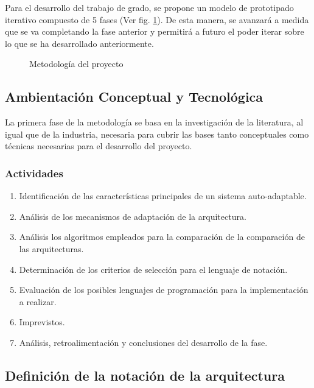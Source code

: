 \documentclass[12pt]{article}
\begin{document}
    Para el desarrollo del trabajo de grado, se propone un modelo de prototipado iterativo compuesto de 5 fases (Ver fig. \ref{fig:met}). De esta manera, se avanzará a medida que se va completando la fase anterior y permitirá a futuro el poder iterar sobre lo que se ha desarrollado anteriormente.

    \begin{figure}[H]
        \centering
        
        \caption{Metodología del proyecto}
        \label{fig:met}
    \end{figure}

    \subsection{Ambientación Conceptual y Tecnológica}

    La primera fase de la metodología se basa en la investigación de la literatura, al igual que de la industria, necesaria para cubrir las bases tanto conceptuales como técnicas necesarias para el desarrollo del proyecto. 

    \subsubsection*{Actividades}

    \begin{enumerate}[label=\thesubsection.\arabic*., wide, labelindent=2em, leftmargin=5em]
        \item Identificación de las características principales de un sistema auto-adaptable.
        \item Análisis de los mecanismos de adaptación de la arquitectura.
        \item Análisis los algoritmos empleados para la comparación de la comparación de las arquitecturas.
        \item Determinación de los criterios de selección para el lenguaje de notación.
        \item Evaluación de los posibles lenguajes de programación para la implementación a realizar.
        \item Imprevistos.
        \item Análisis, retroalimentación y conclusiones del desarrollo de la fase. 
    \end{enumerate} 

    \subsection{Definición de la notación de la arquitectura}
    
\end{document}
